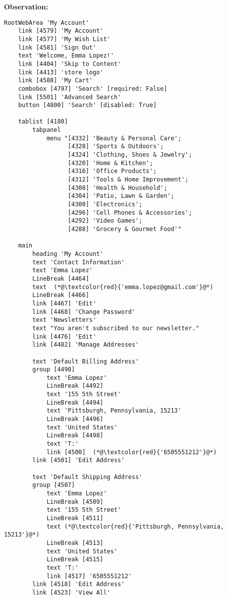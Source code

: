 \begin{tcolorbox}[breakable]
\small
\ttfamily
{}
\textbf{Observation:}
\begin{lstlisting}
RootWebArea 'My Account'
    link [4579] 'My Account'
    link [4577] 'My Wish List'
    link [4581] 'Sign Out'
    text 'Welcome, Emma Lopez!'
    link [4404] 'Skip to Content'
    link [4413] 'store logo'
    link [4588] 'My Cart'
    combobox [4797] 'Search' [required: False]
    link [5501] 'Advanced Search'
    button [4800] 'Search' [disabled: True]

    tablist [4180]
        tabpanel
            menu "[4332] 'Beauty & Personal Care'; 
                  [4328] 'Sports & Outdoors'; 
                  [4324] 'Clothing, Shoes & Jewelry'; 
                  [4320] 'Home & Kitchen'; 
                  [4316] 'Office Products'; 
                  [4312] 'Tools & Home Improvement'; 
                  [4308] 'Health & Household'; 
                  [4304] 'Patio, Lawn & Garden'; 
                  [4300] 'Electronics'; 
                  [4296] 'Cell Phones & Accessories'; 
                  [4292] 'Video Games'; 
                  [4288] 'Grocery & Gourmet Food'"

    main
        heading 'My Account'
        text 'Contact Information'
        text 'Emma Lopez'
        LineBreak [4464]
        text  (*@\textcolor{red}{'emma.lopez@gmail.com'}@*) 
        LineBreak [4466]
        link [4467] 'Edit'
        link [4468] 'Change Password'
        text 'Newsletters'
        text "You aren't subscribed to our newsletter."
        link [4476] 'Edit'
        link [4482] 'Manage Addresses'

        text 'Default Billing Address'
        group [4490]
            text 'Emma Lopez'
            LineBreak [4492]
            text '155 5th Street'
            LineBreak [4494]
            text 'Pittsburgh, Pennsylvania, 15213'
            LineBreak [4496]
            text 'United States'
            LineBreak [4498]
            text 'T:'
            link [4500]  (*@\textcolor{red}{'6505551212'}@*) 
        link [4501] 'Edit Address'

        text 'Default Shipping Address'
        group [4507]
            text 'Emma Lopez'
            LineBreak [4509]
            text '155 5th Street'
            LineBreak [4511]
            text (*@\textcolor{red}{'Pittsburgh, Pennsylvania, 15213'}@*) 
            LineBreak [4513]
            text 'United States'
            LineBreak [4515]
            text 'T:'
            link [4517] '6505551212'
        link [4518] 'Edit Address'
        link [4523] 'View All'


\end{lstlisting}
\end{tcolorbox}
